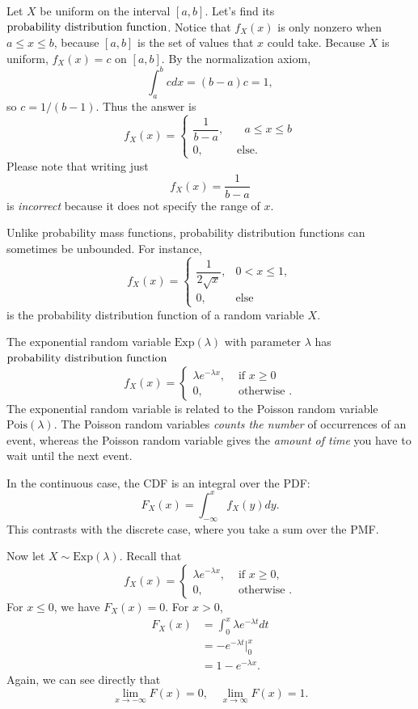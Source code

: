 \documentclass{ximera}
\begin{document}
\begin{example}
Let $X$ be uniform on the interval $[a,b]$. Let's find its $\text{probability distribution function}$. Notice that $f_X(x)$ is only nonzero when $a \leq x \leq b$, because $[a,b]$ is the set of values that $x$ could take. Because $X$ is uniform, $f_X(x)=c$ on $[a,b]$. By the normalization axiom,
$$
\int_a^b c dx = (b-a)c= 1,
$$
so $c= 1/(b-1)$. Thus the answer is
$$
f_X(x)
= 
\begin{cases}
\dfrac{1}{b-a}, &\quad a \leq x \leq b \\
0, & \text{ else}.
\end{cases}
$$
Please note that writing just
$$
f_X(x) = \frac{1}{b-a}
$$
is \textit{incorrect} because it does not specify the range of $x$.
\end{example}

Unlike probability mass functions, probability distribution functions can sometimes be unbounded. For instance,
$$
f_X(x)
= 
\begin{cases}
\dfrac{1}{2\sqrt{x}}, & 0 < x \leq 1,\\
0, & \text{else}
\end{cases}
$$
is the probability distribution function of a random variable $X$.

\begin{example}
The exponential random variable $\mathrm{Exp}(\lambda)$ with parameter $\lambda$ has $\text{probability distribution function}$
$$
f_X(x)
= 
\begin{cases}
\lambda e^{-\lambda x}, & \text{ if } x \geq 0\\
0, & \text{ otherwise }.
\end{cases}
$$
The exponential random variable is related to the Poisson random variable $\mathrm{Pois}(\lambda)$. The Poisson random variables \textit{counts the number} of occurrences of an event, whereas the Poisson random variable gives the \textit{amount of time} you have to wait until the next event.
\end{example}


In the continuous case, the CDF is an integral over the PDF:
$$
F_X(x) = \int_{-\infty}^x f_X(y)dy.
$$
This contrasts with the discrete case, where you take a sum over the PMF.







Now let $X \sim \mathrm{Exp}(\lambda)$. Recall that
$$
f_X(x)
= 
\begin{cases}
\lambda e^{-\lambda x}, & \text{ if } x \geq 0, \\
0, & \text{ otherwise }.
\end{cases}
$$
For $x \leq 0$, we have $F_X(x)=0$. For $x>0$,
\begin{align*}
F_X(x) &= \int_0^x \lambda e^{-\lambda t}dt \\
&= - e^{-\lambda t} \vert_0^x \\
&= 1 - e^{-\lambda x}.
\end{align*}
Again, we can see directly that
$$
\lim_{x\rightarrow -\infty} F(x) = 0, \quad \lim_{x \rightarrow \infty} F(x) = 1.
$$
\end{document}
